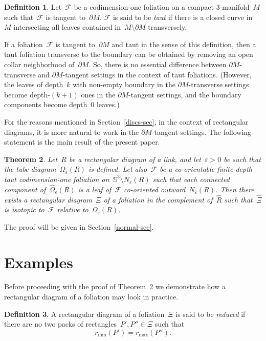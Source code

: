 \documentclass{amsart}
\theoremstyle{theorem}
\newtheorem{theo}{Theorem}[section]
\theoremstyle{remark}
\theoremstyle{definition}
\newtheorem{defi}[theo]{Definition}
\numberwithin{equation}{section}
\numberwithin{figure}{section}
\begin{document}
\begin{defi}
Let~$\mathscr F$ be a codimension-one foliation on a compact $3$-manifold~$M$ such that~$\mathscr F$
is tangent to~$\partial M$. $\mathscr F$ is said to be \emph{taut} if there is a closed curve in~$M$
intersecting all leaves contained in~$M\setminus\partial M$ transversely.
\end{defi}

If a foliation~$\mathscr F$ is tangent to~$\partial M$ and taut in the sense of this definition,
then a taut foliation transverse to the boundary can be obtained by removing an open collar neighborhood of~$\partial M$.
So, there is no essential difference between $\partial M$-transverse and $\partial M$-tangent settings
in the context of taut foliations. (However, the leaves of depth~$k$ with non-empty boundary in the $\partial M$-transverse settings
become depth-$(k+1)$ ones in the $\partial M$-tangent settings, and the boundary components become depth~$0$ leaves.)

For the reasons mentioned in Section~\ref{discs-sec}, in the context of rectangular diagrams, it is more natural to
work in the $\partial M$-tangent settings.
The following statement is the main result of the present paper.

\begin{theo}\label{diagram-exist-thm}
Let~$R$ be a rectangular diagram of a link, and let~$\varepsilon>0$ be such that the tube diagram~$\Omega_\varepsilon(R)$
is defined.
Let also~$\mathscr F$ be a co-orientable finite depth taut codimension-one foliation on~$\mathbb S^3\setminus N_\varepsilon(R)$
such that each connected component of~$\widehat\Omega_\varepsilon(R)$ is a leaf of~$\mathscr F$ co-oriented outward~$N_\varepsilon(R)$.
Then there exists a rectangular diagram~$\Xi$ of a foliation in the complement of~$\widehat R$
such that~$\widehat\Xi$ is isotopic to~$\mathscr F$ relative to~$\Omega_\varepsilon(R)$.
\end{theo}

The proof will be given in Section~\ref{normal-sec}.

\section{Examples}\label{examp-sec}
Before proceeding with the proof of Theorem~\ref{diagram-exist-thm}
we demonstrate how a rectangular diagram of a foliation
may look in practice.

\begin{defi}
A rectangular diagram of a foliation~$\Xi$ is said to be \emph{reduced}
if there are no two packs of rectangles~$P',P''\in\Xi$ such that
\begin{equation}\label{min=max-eq}
r_{\min}(P')=r_{\max}(P'').
\end{equation}
\end{defi}
\end{document}
